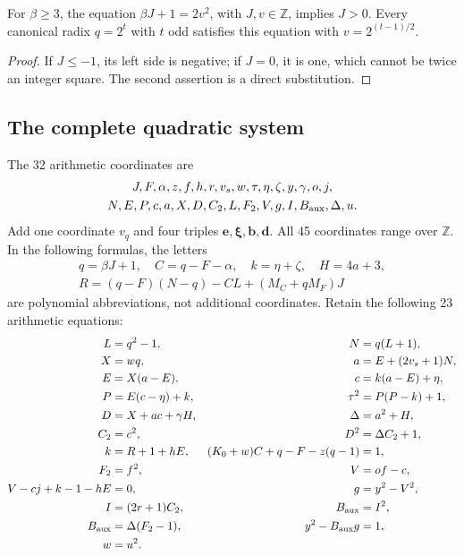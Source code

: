 \begin{lemma}
For \(\beta\ge3\), the equation
\(\beta J+1=2v^2\), with \(J,v\in\mathbb Z\), implies \(J>0\).
Every canonical radix \(q=2^t\) with \(t\) odd satisfies this equation
with \(v=2^{(t-1)/2}\).
\end{lemma}
\begin{proof}
If \(J\le-1\), its left side is negative; if \(J=0\), it is one,
which cannot be twice an integer square.  The second assertion is a
direct substitution.
\end{proof}

\subsection{The complete quadratic system}

The 32 arithmetic coordinates are
\[
\begin{gathered}
J,F,\alpha,z,f,h,r,v_s,w,\tau,\eta,\zeta,y,\gamma,o,j,\\
N,E,P,c,a,X,D,C_2,L,F_2,V,g,I,B_{\rm aux},\Delta,u.
\end{gathered}
\]
Add one coordinate \(v_q\) and four triples
\(\boldsymbol e,\boldsymbol\xi,\boldsymbol b,\boldsymbol d\).
All 45 coordinates range over \(\mathbb Z\).  In the following formulas,
the letters
\[
\begin{gathered}
 q=\beta J+1,\quad C=q-F-\alpha,\quad
 k=\eta+\zeta,\quad H=4a+3,\\
 R=(q-F)(N-q)-CL+(M_C+qM_F)J
\end{gathered}
\]
are polynomial abbreviations, not additional coordinates.  Retain the
following 23 arithmetic equations:
\begin{alignat*}{2}
 L&=q^2-1,&\qquad N&=q(L+1),\\
 X&=wq,&a&=E+(2v_s+1)N,\\
 E&=X(a-E),&c&=k(a-E)+\eta,\\
 P&=E(c-\eta)+k,&\tau^2&=P(P-k)+1,\\
 D&=X+ac+\gamma H,&\Delta&=a^2+H,\\
 C_2&=c^2,&D^2&=\Delta C_2+1,\\
 k&=R+1+hE,&(K_0+w)C+q-F-z(q-1)&=1,\\
 F_2&=f^2,&V&=of-c,\\
 V-cj+k-1-hE&=0,&g&=y^2-V^2,\\
 I&=(2r+1)C_2,&B_{\rm aux}&=I^2,\\
 B_{\rm aux}&=\Delta(F_2-1),&y^2-B_{\rm aux}g&=1,\\
 w&=u^2.&&
\end{alignat*}
